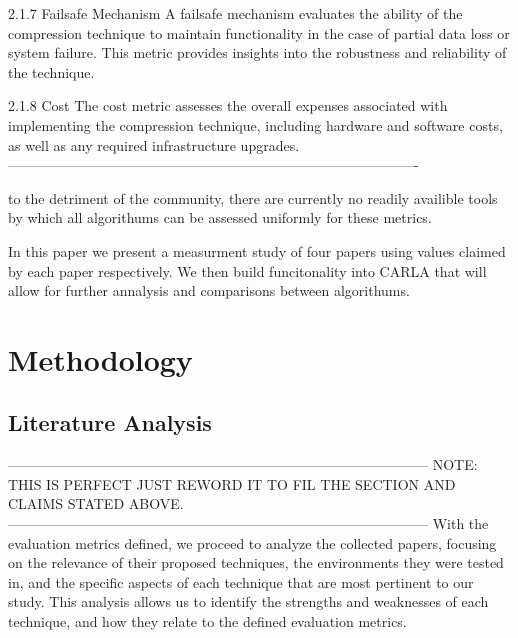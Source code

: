 \documentclass[conference]{IEEEtran}
\begin{document}
2.1.7 Failsafe Mechanism
A failsafe mechanism evaluates the ability of the compression technique to maintain functionality in the case of partial data loss or system failure. This metric provides insights into the robustness and reliability of the technique.

2.1.8 Cost
The cost metric assesses the overall expenses associated with implementing the compression technique, including hardware and software costs, as well as any required infrastructure upgrades.
----------------------------------------------------------------------------------------


to the detriment of the community, there are currently no readily availible tools by which all algorithums can be assessed uniformly for these metrics. 


In this paper we present a measurment study of four papers using values claimed by each paper respectively. We then build funcitonality into CARLA that will allow for further annalysis and comparisons between algorithums.


\section{Methodology}

\subsection{Literature Analysis}
------------------------------------------------------------------------------------------
NOTE: THIS IS PERFECT JUST REWORD IT TO FIL THE SECTION AND CLAIMS STATED ABOVE.
------------------------------------------------------------------------------------------
With the evaluation metrics defined, we proceed to analyze the collected papers, focusing on the relevance of their proposed techniques, the environments they were tested in, and the specific aspects of each technique that are most pertinent to our study. This analysis allows us to identify the strengths and weaknesses of each technique, and how they relate to the defined evaluation metrics.
\end{document}
